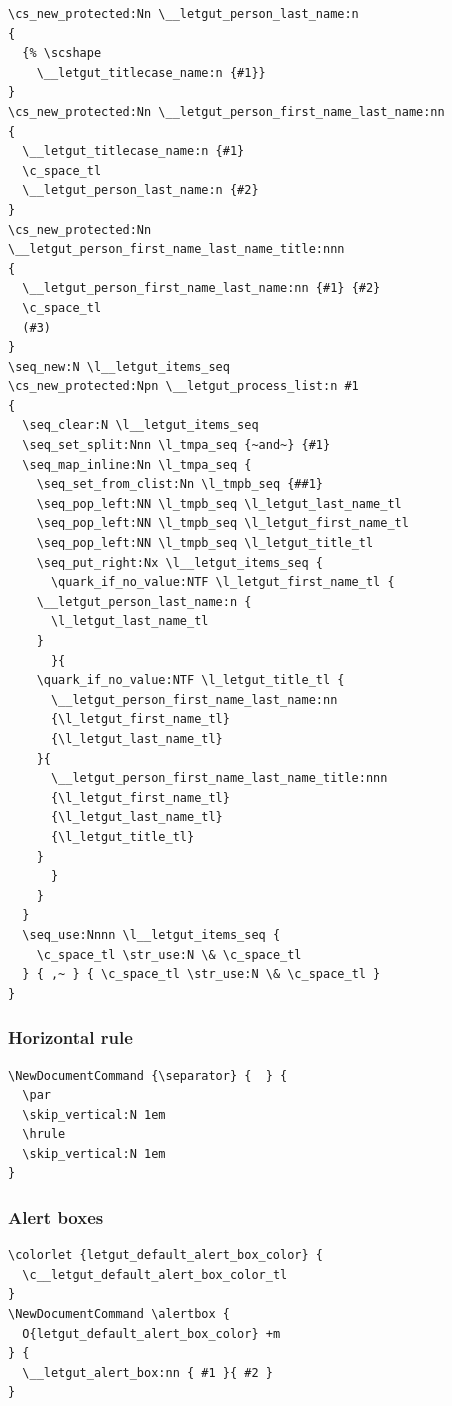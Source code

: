 \documentclass{letgut}
\begin{document}
\begin{lstlisting}
\cs_new_protected:Nn \__letgut_person_last_name:n
{
  {% \scshape
    \__letgut_titlecase_name:n {#1}}
}
\cs_new_protected:Nn \__letgut_person_first_name_last_name:nn
{
  \__letgut_titlecase_name:n {#1}
  \c_space_tl
  \__letgut_person_last_name:n {#2}
}
\cs_new_protected:Nn
\__letgut_person_first_name_last_name_title:nnn
{
  \__letgut_person_first_name_last_name:nn {#1} {#2}
  \c_space_tl
  (#3)
}
\seq_new:N \l__letgut_items_seq
\cs_new_protected:Npn \__letgut_process_list:n #1
{
  \seq_clear:N \l__letgut_items_seq
  \seq_set_split:Nnn \l_tmpa_seq {~and~} {#1}
  \seq_map_inline:Nn \l_tmpa_seq {
    \seq_set_from_clist:Nn \l_tmpb_seq {##1}
    \seq_pop_left:NN \l_tmpb_seq \l_letgut_last_name_tl
    \seq_pop_left:NN \l_tmpb_seq \l_letgut_first_name_tl
    \seq_pop_left:NN \l_tmpb_seq \l_letgut_title_tl
    \seq_put_right:Nx \l__letgut_items_seq {
      \quark_if_no_value:NTF \l_letgut_first_name_tl {
	\__letgut_person_last_name:n {
	  \l_letgut_last_name_tl
	}
      }{
	\quark_if_no_value:NTF \l_letgut_title_tl {
	  \__letgut_person_first_name_last_name:nn
	  {\l_letgut_first_name_tl}
	  {\l_letgut_last_name_tl}
	}{
	  \__letgut_person_first_name_last_name_title:nnn
	  {\l_letgut_first_name_tl}
	  {\l_letgut_last_name_tl}
	  {\l_letgut_title_tl}
	}
      }
    }
  }
  \seq_use:Nnnn \l__letgut_items_seq {
    \c_space_tl \str_use:N \& \c_space_tl
  } { ,~ } { \c_space_tl \str_use:N \& \c_space_tl }
}
\end{lstlisting}

\subsubsection{Horizontal rule}
\label{sec:orgc866c8e}

\begin{lstlisting}
\NewDocumentCommand {\separator} {  } {
  \par
  \skip_vertical:N 1em
  \hrule
  \skip_vertical:N 1em
}
\end{lstlisting}

\subsubsection{Alert boxes}
\label{sec:org7e6600e}

\begin{lstlisting}
\colorlet {letgut_default_alert_box_color} {
  \c__letgut_default_alert_box_color_tl
}
\NewDocumentCommand \alertbox {
  O{letgut_default_alert_box_color} +m
} {
  \__letgut_alert_box:nn { #1 }{ #2 }
}
\end{lstlisting}
\end{document}
